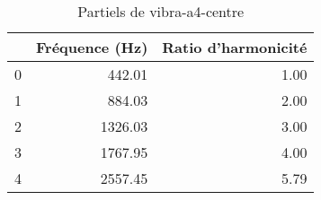 \begin{table}
\centering
\caption{Partiels de vibra-a4-centre}
\label{table:partiels-vibra-a4-centre.wav}
\begin{tabular}{lrr}
\toprule
{} &  Fréquence (Hz) &  Ratio d'harmonicité \\
\midrule
0 &          442.01 &                 1.00 \\
1 &          884.03 &                 2.00 \\
2 &         1326.03 &                 3.00 \\
3 &         1767.95 &                 4.00 \\
4 &         2557.45 &                 5.79 \\
\bottomrule
\end{tabular}
\end{table}
